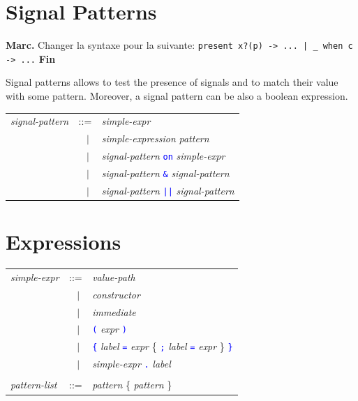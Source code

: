 \documentclass[11pt,titlepage,twoside]{report}
\newcommand{\alt}{\;|\;}
\newcommand{\Minusgreater}{\mbox{{\tt ->}}}
\newcommand{\Equalgreater}{\mbox{{\tt =>}}}
\newcommand{\Marc}[1]{{\bf Marc.} {#1} {\bf Fin}}
\newcommand{\term}[1]{\textcolor{Blue}{\tt #1}}
\newcommand{\nterm}[1]{\textcolor{BrickRed}{\it #1}}
\newcommand{\term}[1]{{\tt #1}}
\newcommand{\nterm}[1]{{\em #1}}
\begin{document}
\section{Signal Patterns\label{sigpatterns}} %

\Marc{Changer la syntaxe pour la
  suivante: \texttt{present x?(p) -> ... | \_ when c -> ...}}

Signal patterns allows to test the presence of signals and to match
their value with some pattern. Moreover, a signal pattern can be also
a boolean expression.
\begin{center}
\begin{tabular}{lcl}
\nterm{signal-pattern} 
   & ::=        & \nterm{simple-expr} \\
   & $\;\;\alt$ & \nterm{simple-expression} \nterm{pattern} \\ 
   & $\;\;\alt$ & \nterm{signal-pattern} \term{on} \nterm{simple-expr} \\
   & $\;\;\alt$ & \nterm{signal-pattern} \term{\&} \nterm{signal-pattern} \\
   & $\;\;\alt$ & \nterm{signal-pattern} \term{||} \nterm{signal-pattern}
\end{tabular}
\end{center}

\section{Expressions\label{expressions}} %

\begin{center}
\begin{tabular}{lcl}
\nterm{simple-expr}
  & ::=        & \nterm{value-path} \\
  & $\;\;\alt$ & \nterm{constructor} \\
  & $\;\;\alt$ & \nterm{immediate} \\
  & $\;\;\alt$ & \term{(} \nterm{expr} \term{)} \\
  & $\;\;\alt$ & \term{\{} \nterm{label} \term{=} \nterm{expr}
                 \{ \term{;} \nterm{label} \term{=} \nterm{expr} \} 
                 \term{\}} \\
  & $\;\;\alt$ & \nterm{simple-expr} \term{.} \nterm{label}
\\ \\
\nterm{pattern-list}           
   & ::=        & \nterm{pattern} \{ \nterm{pattern} \}
\end{tabular}
\end{center}
\end{document}
